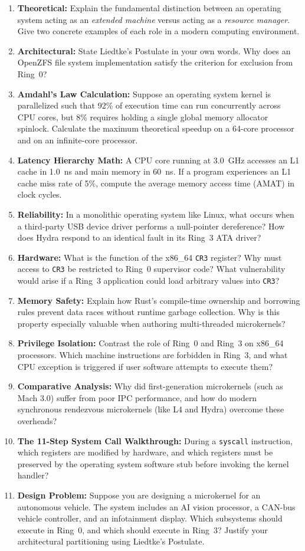 \begin{enumerate}
    \item \textbf{Theoretical:} Explain the fundamental distinction between an operating system acting as an \textit{extended machine} versus acting as a \textit{resource manager}. Give two concrete examples of each role in a modern computing environment.
    \item \textbf{Architectural:} State Liedtke's Postulate in your own words. Why does an OpenZFS file system implementation satisfy the criterion for exclusion from Ring~0?
    \item \textbf{Amdahl's Law Calculation:} Suppose an operating system kernel is parallelized such that 92\% of execution time can run concurrently across CPU cores, but 8\% requires holding a single global memory allocator spinlock. Calculate the maximum theoretical speedup on a 64-core processor and on an infinite-core processor.
    \item \textbf{Latency Hierarchy Math:} A CPU core running at 3.0~GHz accesses an L1 cache in 1.0~ns and main memory in 60~ns. If a program experiences an L1 cache miss rate of 5\%, compute the average memory access time (AMAT) in clock cycles.
    \item \textbf{Reliability:} In a monolithic operating system like Linux, what occurs when a third-party USB device driver performs a null-pointer dereference? How does Hydra respond to an identical fault in its Ring~3 ATA driver?
    \item \textbf{Hardware:} What is the function of the x86\_64 \texttt{CR3} register? Why must access to \texttt{CR3} be restricted to Ring~0 supervisor code? What vulnerability would arise if a Ring~3 application could load arbitrary values into \texttt{CR3}?
    \item \textbf{Memory Safety:} Explain how Rust's compile-time ownership and borrowing rules prevent data races without runtime garbage collection. Why is this property especially valuable when authoring multi-threaded microkernels?
    \item \textbf{Privilege Isolation:} Contrast the role of Ring~0 and Ring~3 on x86\_64 processors. Which machine instructions are forbidden in Ring~3, and what CPU exception is triggered if user software attempts to execute them?
    \item \textbf{Comparative Analysis:} Why did first-generation microkernels (such as Mach 3.0) suffer from poor IPC performance, and how do modern synchronous rendezvous microkernels (like L4 and Hydra) overcome these overheads?
    \item \textbf{The 11-Step System Call Walkthrough:} During a \texttt{syscall} instruction, which registers are modified by hardware, and which registers must be preserved by the operating system software stub before invoking the kernel handler?
    \item \textbf{Design Problem:} Suppose you are designing a microkernel for an autonomous vehicle. The system includes an AI vision processor, a CAN-bus vehicle controller, and an infotainment display. Which subsystems should execute in Ring~0, and which should execute in Ring~3? Justify your architectural partitioning using Liedtke's Postulate.
\end{enumerate}

